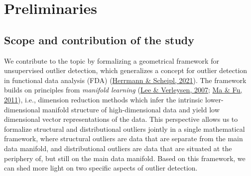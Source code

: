 \documentclass[
  10pt]{article}
\begin{document}
\hypertarget{sec:prelims}{%
\section{Preliminaries}\label{sec:prelims}}

\hypertarget{sec:prelims:scope}{%
\subsection{Scope and contribution of the study}\label{sec:prelims:scope}}

\noindent We contribute to the topic by formalizing a geometrical framework for unsupervised outlier detection, which generalizes a concept for outlier detection in functional data analysis (FDA) (\protect\hyperlink{ref-herrmann2021geometric}{Herrmann \& Scheipl, 2021}). The framework builds on principles from \emph{manifold learning} (\protect\hyperlink{ref-lee2007nonlinear}{Lee \& Verleysen, 2007}; \protect\hyperlink{ref-ma2011manifold}{Ma \& Fu, 2011}), i.e., dimension reduction methods which infer the intrinsic lower-dimensional manifold structure of high-dimensional data and yield low dimensional vector representations of the data. This perspective allows us to formalize structural and distributional outliers jointly in a single mathematical framework, where structural outliers are data that are separate from the main data manifold, and distributional outliers are data that are situated at the periphery of, but still on the main data manifold.
Based on this framework, we can shed more light on two specific aspects of outlier detection.
\end{document}
